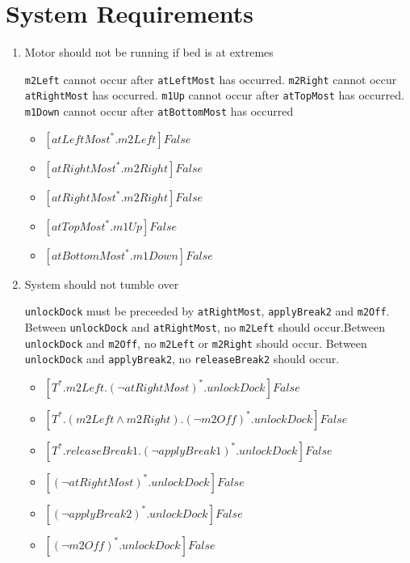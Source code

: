 \documentclass{article}
\begin{document}
\section{System Requirements}
\begin{enumerate}
    \item Motor should not be running if bed is at extremes
    
    \texttt{m2Left} cannot occur after \texttt{atLeftMost} has occurred. \texttt{m2Right} cannot occur \texttt{atRightMost} has occurred. \texttt{m1Up} cannot occur after \texttt{atTopMost} has occurred. \texttt{m1Down} cannot occur after \texttt{atBottomMost} has occurred
    \begin{itemize}
        \item [\textendash] $[atLeftMost^{\ast}.m2Left]False$
        \item [\textendash] $[atRightMost^{\ast}.m2Right]False$
        \item [\textendash] $[atRightMost^{\ast}.m2Right]False$
        \item [\textendash] $[atTopMost^{\ast}.m1Up]False$
        \item [\textendash] $[atBottomMost^{\ast}.m1Down]False$
    \end{itemize}


    \item System should not tumble over
    
    \texttt{unlockDock} must be preceeded by \texttt{atRightMost}, \texttt{applyBreak2} and \texttt{m2Off}. Between \texttt{unlockDock} and \texttt{atRightMost}, no \texttt{m2Left} should occur.Between \texttt{unlockDock} and \texttt{m2Off}, no \texttt{m2Left} or \texttt{m2Right} should occur. Between \texttt{unlockDock} and \texttt{applyBreak2}, no \texttt{releaseBreak2} should occur.

    \begin{itemize}
        \item [\textendash] $[T ^{\ast}.m2Left.(\neg atRightMost)^{\ast}.unlockDock]False$
        \item [\textendash] $[T ^{\ast}.(m2Left \wedge m2Right).(\neg m2Off) ^{\ast}.unlockDock]False$
        \item [\textendash] $[T ^{\ast}.releaseBreak1.(\neg applyBreak1)^{\ast}.unlockDock]False$
        \item [\textendash] $[(\neg atRightMost)^{\ast}.unlockDock]False$
        \item [\textendash] $[(\neg applyBreak2)^{\ast}.unlockDock]False$
        \item [\textendash] $[(\neg m2Off)^{\ast}.unlockDock]False$
    \end{itemize}
    

\end{enumerate}
\end{document}
